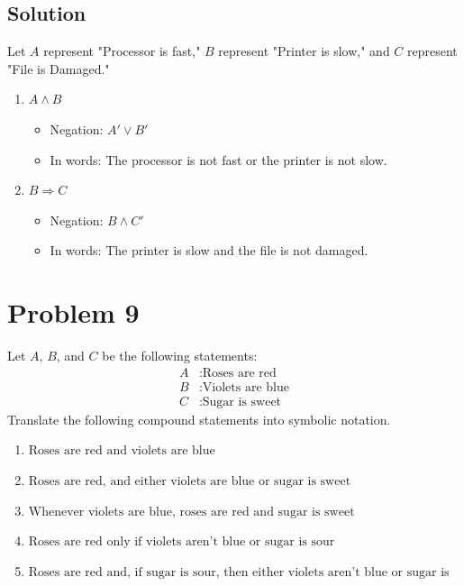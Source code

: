 \documentclass[12pt]{article}
\begin{document}
\subsection*{Solution}
Let \( A \) represent "Processor is fast," \( B \) represent "Printer is slow," and \( C \) represent "File is Damaged."
\begin{enumerate}
    \item \( A \land B \)
    \begin{itemize}
        \item Negation: \( A' \lor B' \)
        \item In words: The processor is not fast or the printer is not slow.
    \end{itemize}
    
    \item \( B \Rightarrow C \)
    \begin{itemize}
        \item Negation: \( B \land C' \)
        \item In words: The printer is slow and the file is not damaged.
    \end{itemize}
\end{enumerate}

\newpage
\section*{Problem 9}
Let \( A \), \( B \), and \( C \) be the following statements:
\begin{align*}
    A & : \text{Roses are red} \\
    B & : \text{Violets are blue} \\
    C & : \text{Sugar is sweet}
\end{align*}
Translate the following compound statements into symbolic notation.
\begin{enumerate}
    \item \( \text{Roses are red and violets are blue} \)
    \item \( \text{Roses are red, and either violets are blue or sugar is sweet} \)
    \item \( \text{Whenever violets are blue, roses are red and sugar is sweet} \)
    \item \( \text{Roses are red only if violets aren’t blue or sugar is sour} \)
    \item \( \text{Roses are red and, if sugar is sour, then either violets aren’t blue or sugar is sweet} \)
\end{enumerate}
\newpage
\end{document}
